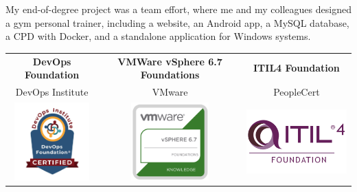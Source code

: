 \documentclass[9pt]{developercv} %
\newif\ifen
\newif\ifes
\newcommand{\en}[1]{\ifen#1\fi}
\newcommand{\es}[1]{\ifes#1\fi}
\begin{document}
\begin{entrylist}
{{          My end-of-degree project was a team effort,
          where me and my colleagues designed a gym personal trainer,
          including a website,
          an Android app,
          a MySQL database,
          a CPD with Docker,
          and a standalone application for Windows systems.
        }
      }
\end{entrylist}


\cvsect{
  \es{Certificaciones oficiales}
  \en{Official certifications}
}

\setlength{\tabcolsep}{12pt}
\begin{tabular}{ccc}
  \textbf{DevOps Foundation} & \textbf{VMWare vSphere 6.7 Foundations} & \textbf{ITIL4 Foundation} \\
  DevOps Institute & VMware & PeopleCert \\
  \includegraphics[height=3cm]{img/cert_devops.jpg} &
  \includegraphics[height=3cm]{img/cert_vmware-foundations.png} &
  \includegraphics[height=3cm]{img/cert_itil4-foundation.png}
\end{tabular}\\

\end{document}
